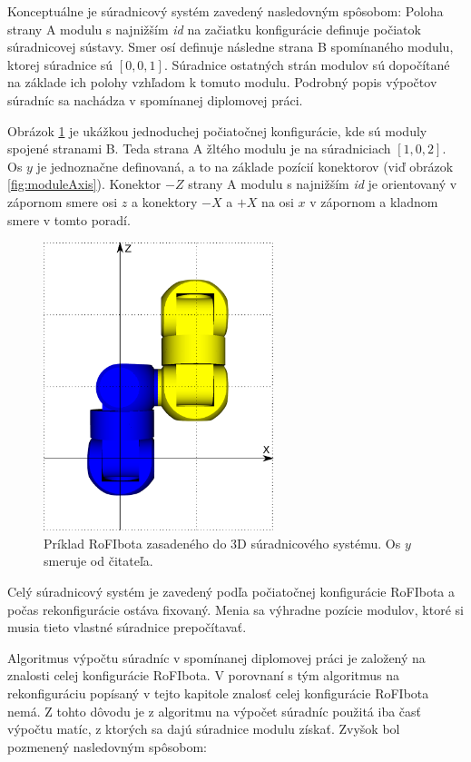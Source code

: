 \documentclass[
  printed, %
  oneside, %
  notable,   %
  nolof,     %
  nolot,     %
]{fithesis3}
\begin{document}
Konceptuálne je súradnicový systém zavedený nasledovným spôsobom: Poloha strany A modulu s najnižším \textit{id} na začiatku konfigurácie definuje počiatok súradnicovej sústavy. Smer osí definuje následne strana B spomínaného modulu, ktorej súradnice sú $[0, 0, 1]$. Súradnice ostatných strán modulov sú dopočítané na základe ich polohy vzhľadom k tomuto modulu. Podrobný popis výpočtov súradníc sa nachádza v spomínanej diplomovej práci.  

Obrázok \ref{fig:moduleCoordinates} je ukážkou jednoduchej počiatočnej konfigurácie, kde sú moduly spojené stranami B. Teda strana A žltého modulu je na súradniciach $[1, 0, 2]$. Os $y$ je jednoznačne definovaná, a to na základe pozícií konektorov (viď obrázok \ref{fig:moduleAxis}). Konektor $-Z$ strany A modulu s najnižším \textit{id} je orientovaný v zápornom smere osi $z$ a konektory $-X$ a $+X$ na osi $x$ v zápornom a kladnom smere v tomto poradí. 

\begin{figure}[hbt!]
    \centering
    \includegraphics[width=0.6\textwidth]{pictures/module_coordinates.pdf}
    \caption[Ukážka súradnicového systému]{Príklad RoFIbota zasadeného do 3D súradnicového systému. Os $y$ smeruje od čitateľa. }
    \label{fig:moduleCoordinates}
\end{figure}

Celý súradnicový systém je zavedený podľa počiatočnej konfigurácie RoFIbota a počas rekonfigurácie ostáva fixovaný. Menia sa výhradne pozície modulov, ktoré si musia tieto vlastné súradnice prepočítavať. 

Algoritmus výpočtu súradníc v spomínanej diplomovej práci je založený na znalosti celej konfigurácie RoFIbota. V porovnaní s tým algoritmus na rekonfiguráciu popísaný v tejto kapitole znalosť celej konfigurácie RoFIbota nemá. Z tohto dôvodu je z algoritmu na výpočet súradníc použitá iba časť výpočtu matíc, z ktorých sa dajú súradnice modulu získať. Zvyšok bol pozmenený nasledovným spôsobom: 
\end{document}
